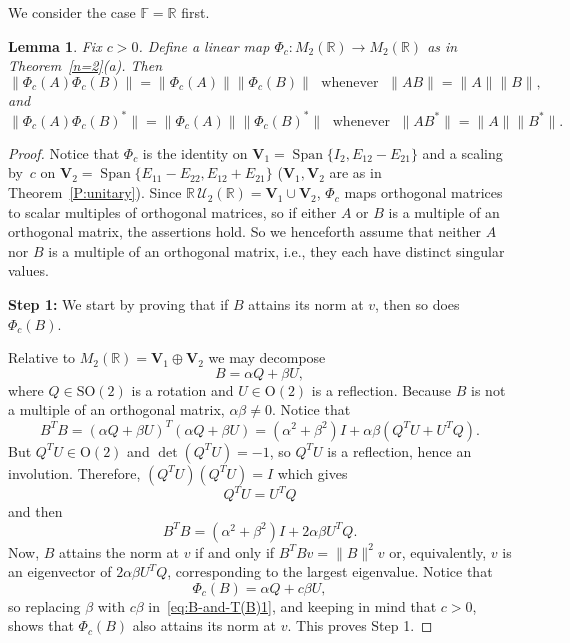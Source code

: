 \documentclass[11pt]{article}
\newtheorem{lemma}[theorem]{Lemma}
\numberwithin{equation}{section}
\def\IF{{\mathbb F}}
\def\IR{{\mathbb R}}
\def\bV{{\mathbf V}}
\def\span{{\mathop{\mathrm{Span}}\nolimits}}
\def\bV{{\mathbf V}}
\begin{document}
We consider the case $\IF = \IR$ first.

\begin{lemma}\label{L:special-map}
	Fix $c>0$.  Define a linear map $\Phi_c\colon  M_2(\IR) \to M_2(\IR)$ as in Theorem~\ref{n=2}{\rm (a)}.
	 	Then
	$$\|\Phi_c(A) \Phi_c(B) \| = \|\Phi_c(A)\| \|\Phi_c(B)\| \; \text{ whenever } \; \|AB\| = \|A\| \|B\|,$$
	and
	$$\|\Phi_c(A) \Phi_c(B)^* \| = \|\Phi_c(A)\| \|\Phi_c(B)^* \| \; \text{ whenever } \; \|AB^*\| = \|A\| \|B^*\|.$$
\end{lemma}

\begin{proof}
Notice that $\Phi_c$ is the identity on $\bV_1=\span \{I_2, E_{12}-E_{21}\}$  and a scaling  by~$c$ on  $\bV_2=\span\{E_{11}-E_{22}, E_{12}+E_{21}\}$  ($\bV_1,\bV_2$ are as in Theorem~\ref{P:unitary}).
Since $\IR\,{\mathcal U}_2(\IR)=\bV_1\cup\bV_2$,  $\Phi_c$ maps orthogonal matrices to scalar multiples of orthogonal matrices, so if either $A$ or $B$ is a multiple of an orthogonal matrix, the assertions hold.  So we henceforth assume that neither $A$ nor $B$ is a multiple of an orthogonal matrix, i.e., they each have distinct singular values.

	\textbf{Step 1:} We start by proving that if $B$ attains its norm at $v$, then so does $\Phi_c(B)$.

	Relative to $M_2(\IR)=\textbf{V}_1\oplus \textbf{V}_2$
	 	we may decompose
	\[
	B = \alpha Q + \beta U,
	\]
	where \( Q \in \mathrm{SO}(2) \) is a rotation and  $U\in \mathrm{O}(2)$ is a reflection.  	Because $B$ is not a multiple of an orthogonal matrix, $\alpha \beta \ne 0$.  Notice that
	\[
	B^T B = (\alpha Q + \beta U)^T (\alpha Q + \beta U) = (\alpha^2 + \beta^2) I +  \alpha \beta (Q^TU+U^T Q).
	\]
	But \( Q^T U \in \mathrm{O}(2) \) and \( \det(Q^T U) = -1 \), so \( Q^T U \) is a reflection, hence an involution. Therefore, $(Q^T U)(Q^T U)=I$ which gives
	\[ Q^T U = U^T Q
	\]
	and  then
	\begin{equation}\label{eq:B-and-T(B)1}
		B^T B = (\alpha^2 + \beta^2) I + 2 \alpha \beta U^TQ.
	\end{equation}
	Now,
	\( B \) attains the norm at \( v \) if and only if  \( B^T B v = \|B\|^2 v \) or, equivalently, \( v \) is an eigenvector of \(2\alpha\beta U^T Q \), corresponding to the largest eigenvalue. Notice that
	\[ \Phi_c(B) = \alpha Q + c \beta U ,\] so replacing \( \beta \) with \( c\beta \) in~\eqref{eq:B-and-T(B)1}, and keeping in mind that $c>0$, shows that \( \Phi_c(B) \) also attains its norm at \( v \).  This proves Step 1.


\end{proof}
\end{document}
